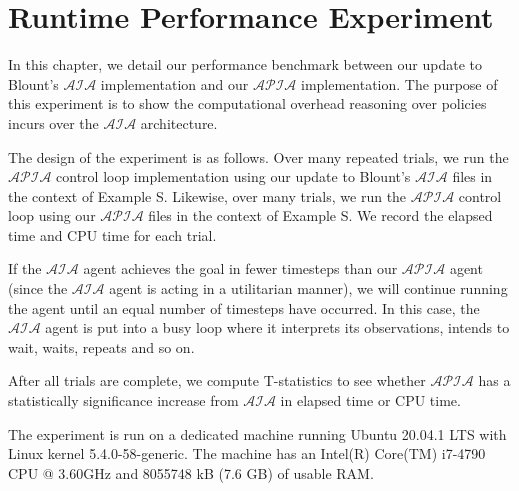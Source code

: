 \chapter{Runtime Performance Experiment}

%

In this chapter, we detail our performance benchmark between our update to Blount's $\mathcal{AIA}$ implementation and our $\mathcal{APIA}$ implementation.
The purpose of this experiment is to show the computational overhead reasoning over policies incurs over the $\mathcal{AIA}$ architecture.

The design of the experiment is as follows.
Over many repeated trials, we run the $\mathcal{APIA}$ control loop implementation using our update to Blount's $\mathcal{AIA}$ files in the context of Example S.
Likewise, over many trials, we run the $\mathcal{APIA}$ control loop using our $\mathcal{APIA}$ files in the context of Example S.
We record the elapsed time and CPU time for each trial.

If the $\mathcal{AIA}$ agent achieves the goal in fewer timesteps than our $\mathcal{APIA}$ agent (since the $\mathcal{AIA}$ agent is acting in a utilitarian manner), we will continue running the agent until an equal number of timesteps have occurred.
In this case, the $\mathcal{AIA}$ agent is put into a busy loop where it interprets its observations, intends to wait, waits, repeats and so on.

After all trials are complete, we compute T-statistics to see whether $\mathcal{APIA}$ has a statistically significance increase from $\mathcal{AIA}$ in elapsed time or CPU time.

The experiment is run on a dedicated machine running Ubuntu 20.04.1 LTS with Linux kernel 5.4.0-58-generic.
The machine has an Intel(R) Core(TM) i7-4790 CPU @ 3.60GHz and 8055748 kB (7.6 GB) of usable RAM.
